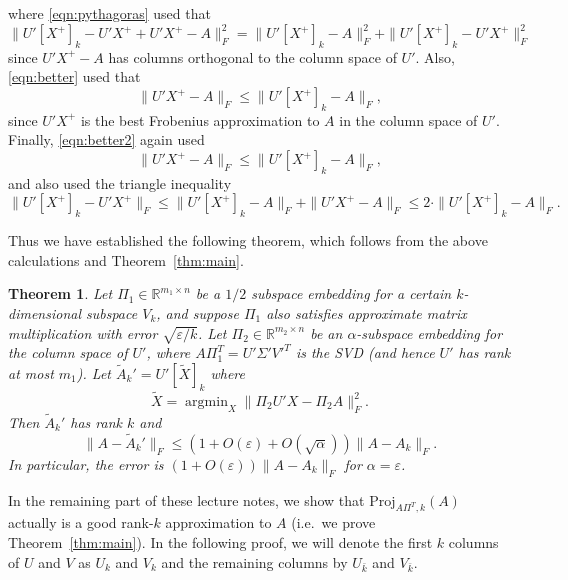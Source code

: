 \documentclass[11pt]{article}
\newcommand{\eps}{\varepsilon}
\newcommand{\R}{\mathbb{R}}
\newtheorem{theorem}{Theorem}
\begin{document}
where \eqref{eqn:pythagoras} used that $\|U'[X^+]_k - U'X^+ + U'X^+ - A\|_F^2 = \|U'[X^+]_k - A\|_F^2 + \|U'[X^+]_k - U'X^+\|_F^2$ since $U'X^+ - A$ has columns orthogonal to the column space of $U'$. Also, \eqref{eqn:better} used that 
$$\|U'X^+ - A\|_F \le \|U'[X^+]_k - A\|_F ,$$
since $U'X^+$ is the best Frobenius approximation to $A$ in the column space of $U'$. Finally, \eqref{eqn:better2} again used 
$$\|U'X^+ - A\|_F \le \|U'[X^+]_k - A\|_F ,$$
and also used the triangle inequality 
$$\|U'[X^+]_k - U'X^+\|_F \le \|U'[X^+]_k - A\|_F + \|U'X^+ - A\|_F \le 2\cdot \|U'[X^+]_k - A\|_F .$$

Thus we have established the following theorem, which follows from the above calculations and Theorem~\ref{thm:main}.
\begin{theorem}
Let $\Pi_1 \in \R^{m_1\times n}$ be a $1/2$ subspace embedding for a certain $k$-dimensional subspace $V_k$, and suppose $\Pi_1$ also satisfies approximate matrix multiplication with error $\sqrt{\eps/k}$. Let $\Pi_2\in\R^{m_2\times n}$ be an $\alpha$-subspace embedding for the column space of $U'$, where $A\Pi_1^T = U'\Sigma'V'^T$ is the SVD (and hence $U'$ has rank at most $m_1$). Let $\tilde{A}_k' = U'[\tilde{X}]_k$ where
$$
\tilde{X} = \mathop{argmin}_X \|\Pi_2 U' X - \Pi_2 A\|_F^2 .
$$
Then $\tilde{A}_k'$ has rank $k$ and
$$
\|A - \tilde{A}_k'\|_F \le (1 + O(\eps) + O(\sqrt{\alpha}))\|A - A_k\|_F .
$$
In particular, the error is $(1 + O(\eps))\|A - A_k\|_F$ for $\alpha = \eps$.
\end{theorem}

In the remaining part of these lecture notes, we show that $\mathrm{Proj}_{A\Pi^T, k}(A)$ actually is a good rank-$k$ approximation to $A$ (i.e.\ we prove Theorem~\ref{thm:main}). In the following proof, we will denote the first $k$ columns of $U$ and $V$ as $U_k$ and $V_k$ and the remaining columns by $U_{\bar{k}}$ and $V_{\bar{k}}$.
\end{document}
